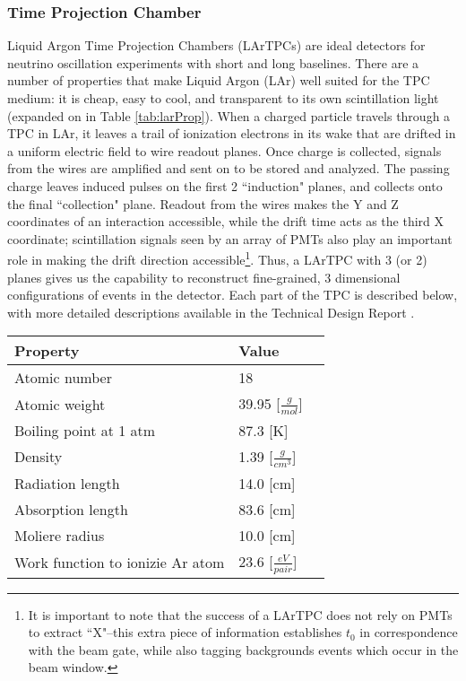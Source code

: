 \documentclass[12pt]{article}
\begin{document}
\subsubsection{Time Projection Chamber} 
\par Liquid Argon Time Projection Chambers (LArTPCs) are ideal detectors for neutrino oscillation experiments with short and long baselines.  There are a number of properties that make Liquid Argon (LAr) well suited for the TPC medium: it is cheap, easy to cool, and transparent to its own scintillation light (expanded on in Table \ref{tab:larProp}).  When a charged particle travels through a TPC in LAr, it leaves a trail of ionization electrons in its wake that are drifted in a uniform electric field to wire readout planes. Once charge is collected, signals from the wires are amplified and sent on to be stored and analyzed. The passing charge leaves induced pulses on the first 2 ``induction" planes, and collects onto the final ``collection" plane. Readout from the wires makes the Y and Z coordinates of an interaction accessible, while the drift time acts as the third X coordinate; scintillation signals seen by an array of PMTs also play an important role in making the drift direction accessible\footnote{It is important to note that the success of a LArTPC does not rely on PMTs to extract ``X"--this extra piece of information establishes $t_0$ in correspondence with the beam gate, while also tagging backgrounds events which occur in the beam window.}.  Thus, a LArTPC with 3 (or 2) planes gives us the capability to reconstruct fine-grained, 3 dimensional configurations of events in the detector. Each part of the TPC is described below, with more detailed descriptions available in the Technical Design Report \cite{bib:tdr}.


\begin{minipage}{\linewidth}
\centering
{} 
 \begin{tabular}{| l | l | l |}
 \hline
 Property & Value \\ [0.1ex] \hline \hline 
 Atomic number & 18 \\ \hline
 Atomic weight & 39.95 [$\frac{g}{mol}$] \\ \hline
 Boiling point at 1 atm & 87.3 [K] \\ \hline
 Density & 1.39 [$\frac{g}{cm^3}$] \\ \hline
 Radiation length & 14.0 [cm] \\ \hline
Absorption length & 83.6 [cm] \\ \hline
 Moliere radius & 10.0 [cm] \\ \hline 
 Work function to ionizie Ar atom  & 23.6 [$\frac{eV}{pair}$] \\
\hline
\end{tabular}
\end{minipage}
\end{document}
